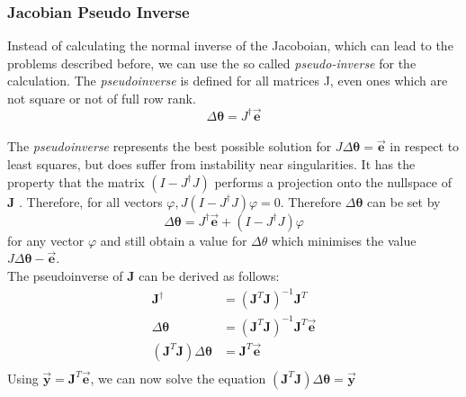 \subsubsection{Jacobian Pseudo Inverse}
Instead of calculating the normal inverse of the Jacoboian, which can lead to the problems described before, we can use the so called \textit{pseudo-inverse}\cite{Dahmen.2008} for the calculation. The \textit{pseudoinverse} is defined for all matrices J, even ones
which are not square or not of full row rank.
\begin{equation}
\label{pseudo inv def}
\Delta\pmb{\theta}=J^{\dagger}\vec{\pmb{e}}
\end{equation}
\\The \textit{pseudoinverse} represents the best possible solution for $ J\Delta\pmb{\theta}=\vec{\pmb{e}}$ in respect to least squares, but does suffer from instability near singularities. It has the property that the matrix $(I − J^{\dagger}J)$ performs a projection onto the nullspace of \textbf{J} . Therefore, for all vectors $\varphi, J(I −J^{\dagger}J)\varphi = 0$. Therefore $\Delta\pmb{\theta}$ can be set by
\begin{equation}
\Delta\pmb{\theta}=J^{\dagger}\vec{\pmb{e}}+(I-J^{\dagger}J)\varphi
\end{equation}
for any vector $\varphi$ and still obtain a value for $\Delta\theta$ which minimises the value $ J\Delta\pmb{\theta} −\vec{\pmb{e}}$.
\\The pseudoinverse of \textbf{J} can be derived as follows:
\begin{equation}
\begin{split}
\pmb{J}^{\dagger}&=(\pmb{J}^{T}\pmb{J})^{-1}\pmb{J}^{T}\\
\Delta\pmb{\theta}&=(\pmb{J}^{T}\pmb{J})^{-1}\pmb{J}^{T}\vec{\pmb{e}}\\
(\pmb{J}^{T}\pmb{J})\Delta\pmb{\theta}&=\pmb{J}^{T}\vec{\pmb{e}}\\
\end{split}
\end{equation}
Using $\vec{\pmb{y}}=\pmb{J}^{T}\vec{\pmb{e}}$, we can now solve the equation $(\pmb{J}^{T}\pmb{J})\Delta\pmb{\theta}=\vec{\pmb{y}}$

